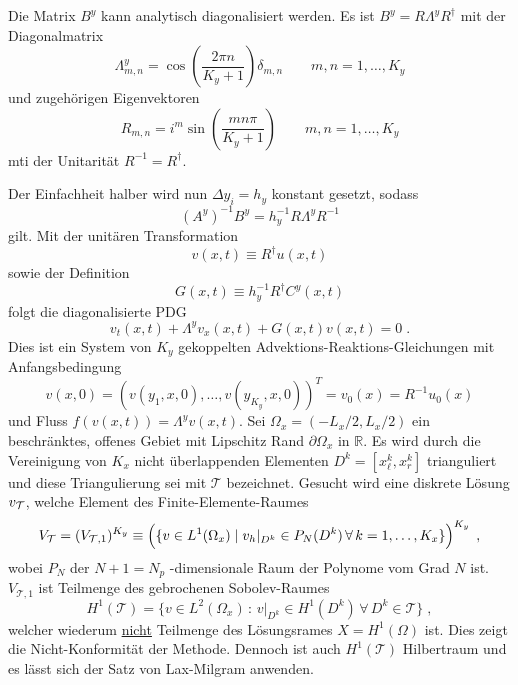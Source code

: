 Die Matrix $B^y$ kann analytisch diagonalisiert werden. Es ist ${B^y = R\Lambda^y R^{\dagger}}$ mit der Diagonalmatrix
\begin{equation}
  \Lambda^y_{m,n} = \cos\left(\frac{2\pi n}{K_y+1}\right)\delta_{m,n}   \qquad m,n = 1,\dots,K_y
\end{equation}
und zugehörigen Eigenvektoren
\begin{equation}
  R_{m,n} = i^m \sin\left(\frac{mn\pi}{K_y +1} \right)   \qquad m,n = 1,\dots,K_y
\end{equation}
mti der Unitarität $R^{-1} = R^{\dagger}$.

Der Einfachheit halber wird nun $\Delta y_i = h_y$ konstant gesetzt, sodass
\begin{equation}
  (A^y)^{-1}B^y = h_y^{-1}R\Lambda^y R^{-1}
\end{equation}
gilt. Mit der unitären Transformation
\begin{equation}
  v(x,t) \equiv R^{\dagger}u(x,t)
\end{equation}
sowie der Definition
\begin{equation}
  G(x,t) \equiv h_y^{-1} R^{\dagger}C^y(x,t)
\end{equation}
folgt die diagonalisierte PDG
\begin{equation}
  v_t(x,t) + \Lambda^y v_x(x,t) + G(x,t)v(x,t) = 0 \; .
  \label{eq:diagLVN}
\end{equation}
Dies ist ein System von $K_y$ gekoppelten Advektions-Reaktions-Gleichungen mit Anfangsbedingung
\begin{equation}
  v(x,0) = (v(y_1,x,0),\dots,v(y_{K_y},x,0))^T = {v}_0(x) = R^{-1}u_0(x)
\end{equation}
und Fluss ${{f}({v}(x,t))=\Lambda^y {v}(x,t)}$. Sei ${\Omega_x = (-L_x/2,L_x/2)}$ ein beschränktes, offenes Gebiet mit Lipschitz Rand $\partial\Omega_x$ in  $\mathbb{R}$. Es wird durch die Vereinigung von $K_x$ nicht überlappenden Elementen ${D^k = [x_\ell^k,x_r^k]}$ trianguliert und diese Triangulierung sei mit $\mathcal{T}$ bezeichnet. Gesucht wird eine diskrete Lösung $v_{\mathcal{T}}$, welche Element des Finite-Elemente-Raumes
\begin{equation}
  V_{\mathcal{T}} = (V_{\mathcal{T},1})^{K_y} \equiv \left( \{ v \in L^1(\Omega_x) \;|\; v_h\rvert_{D^k} \in P_N(D^k) \, \forall \, k=1,\dots,K_x \} \right)^{K_y} \; ,
  \label{eq:FES}
\end{equation}
wobei $P_N$ der ${N+1=N_p}$ -dimensionale Raum der Polynome vom Grad $N$ ist. $V_{\mathcal{T},1}$ ist Teilmenge des gebrochenen Sobolev-Raumes
\begin{equation}
    H^1(\mathcal{T}) = \{ v \in L^2(\Omega_x) \, : \, v|_{D^k} \in H^1(D^k) \, \forall \, D^k \in \mathcal{T} \} \; ,
\end{equation}
welcher wiederum \underline{nicht} Teilmenge des Lösungsrames $X=H^1(\Omega)$ ist. Dies zeigt die Nicht-Konformität der Methode. Dennoch ist auch $H^1(\mathcal{T})$ Hilbertraum und es lässt sich der Satz von Lax-Milgram anwenden.

